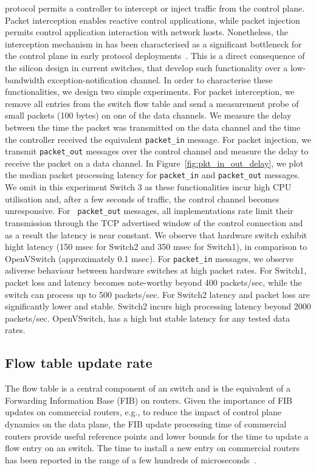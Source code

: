\of protocol permits a controller to intercept or inject traffic from the
control plane. Packet interception enables reactive control applications, while
packet injection permits control application interaction with network hosts.
Nonetheless, the interception mechanism in \of has been characterised as a
significant bottleneck for the control plane in early \of protocol
deployments~\cite{Kobayashi:vn}. This is a direct consequence of the silicon
design in current \of switches, that develop such functionality over a
low-bandwidth exception-notification channel. In order to characterise these
functionalities, we design two simple experiments. For packet interception, we
remove all entries from the switch flow table and send a measurement probe of
small packets (100 bytes) on one of the data channels. We measure the delay
between the time the packet was transmitted on the data channel and the time the
controller received the equivalent {\tt packet\_in} message. For packet
injection, we transmit {\tt packet\_out} messages over the control channel and
measure the delay to receive the packet on a data channel. In
Figure~\ref{fig:pkt_in_out_delay}, we plot the median packet processing latency
for {\tt packet\_in} and {\tt packet\_out} messages. We omit in this experiment
Switch 3 as these functionalities incur high CPU utilisation and, after a few
seconds of traffic, the control channel becomes unresponsive. For {\tt
  packet\_out} messages, all implementations rate limit their transmission
through the TCP advertised window of the control connection and as a result the
latency is near constant. We observe that hardware switch exhibit hight latency
(150 msec for Switch2 and 350 msec for Switch1), in comparison to OpenVSwitch
(approximately 0.1 msec).  For {\tt packet\_in} messages, we observe adiverse
behaviour between hardware switches at high packet rates. For Switch1, packet
loss and latency becomes note-worthy beyond 400 packets/sec, while the switch
can process up to 500 packets/sec. For Switch2 latency and packet loss are
significantly lower and stable. Switch2 incurs high processing latency beyond
2000 packets/sec.  OpenVSwitch, has a high but stable latency for any tested
data rates. 

\subsection{Flow table update rate}\label{sec:results-rate}

The flow table is a central component of an \of switch and is the
equivalent of a Forwarding Information Base (FIB) on routers. Given the
importance of FIB updates on commercial routers, e.g., to reduce the impact of
control plane dynamics on the data plane, the FIB update processing time of
commercial routers provide useful reference points and lower bounds for the time
to update a flow entry on an \of switch. The time to install a new entry on
commercial routers has been reported in the range of a few hundreds of
microseconds~\cite{shaikh-igp}.

